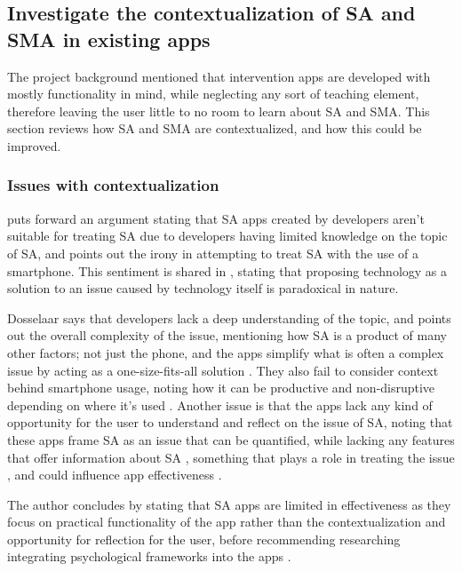 \documentclass[12pt]{article}
\begin{document}
\subsection{Investigate the contextualization of SA and SMA in existing apps}
The project background mentioned that intervention apps are developed with
mostly functionality in mind, while neglecting any sort of teaching element, therefore leaving the user little to 
no room to learn about SA and SMA. This section reviews how SA and SMA are contextualized, and
how this could be improved.

\subsubsection{Issues with contextualization}
\textcite{RefWorks:RefID:35-dosselaar2017smartphone} puts forward an argument stating that 
SA apps created by developers aren't suitable for treating SA due to developers having limited knowledge on the
topic of SA, and points out the irony in attempting to treat SA with the use of a smartphone. This sentiment is 
shared in \textcite{RefWorks:RefID:126-petrucco2021user}, stating that proposing technology as a solution to 
an issue caused by technology itself is paradoxical in nature. \newline

Dosselaar says that developers lack a deep understanding of the topic, and points out the overall complexity of the issue, 
mentioning how SA is a product of many other factors; not just the phone, and the apps simplify what is often a complex 
issue by acting as a one-size-fits-all solution \autocite{RefWorks:RefID:35-dosselaar2017smartphone, RefWorks:RefID:132-monge2019race}. 
They also fail to consider context behind smartphone usage, noting how it can be productive 
\autocite{RefWorks:RefID:35-dosselaar2017smartphone} and non-disruptive depending on where it's used 
\autocite{RefWorks:RefID:126-petrucco2021user}. Another issue is that the apps lack any kind of opportunity
for the user to understand and reflect on the issue of SA, noting that these apps frame
SA as an issue that can be quantified, while lacking any features that offer information about SA 
\autocite{RefWorks:RefID:35-dosselaar2017smartphone}, something that plays a role in treating the issue 
\autocite{RefWorks:RefID:118-rosa2022problematic}, and could influence app effectiveness 
\autocite{RefWorks:RefID:125-rahmillah2023evaluating}.\newline

The author concludes by stating that SA apps are limited in effectiveness as they focus on practical
functionality of the app rather than the contextualization and opportunity for reflection for the user, before
recommending researching integrating psychological frameworks into the apps
\autocite{RefWorks:RefID:35-dosselaar2017smartphone}.
\end{document}
